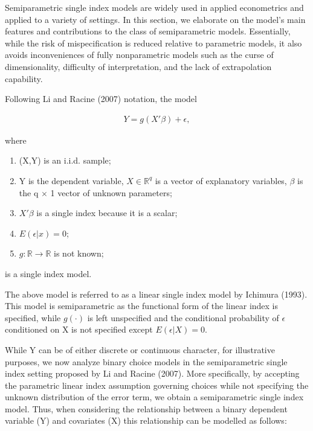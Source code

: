 \documentclass[a4paper]{article}
\begin{document}
Semiparametric single index models are widely used in applied econometrics and applied to a variety of settings.
In this section, we elaborate on the model's main features and contributions to the class of semiparametric models. Essentially, while the risk of mispecification is reduced relative to parametric models, it also avoids inconveniences of fully nonparametric models such as the curse of dimensionality, difficulty of interpretation, and the lack of extrapolation capability.
  
\vspace{5mm} 

Following Li and Racine (2007) notation, the model 

\begin{eqnarray}
Y = g(X'\beta) + \epsilon,  %
\end{eqnarray}

where

\begin{enumerate}
	\item (X,Y) is an i.i.d. sample; %
	\item Y is the dependent variable, $X\in \mathbb{R}^{q}$ is a vector of explanatory variables, $\beta$ is the q $\times$ 1 vector of unknown parameters; %
	\item $X'\beta$ is a single index because it is a scalar;
	\item $ E(\epsilon|x) = 0 $;
	\item $g: \mathbb{R} \rightarrow \mathbb{R} $ is not known; %
\end{enumerate}

is a single index model.

\vspace{5mm} 

The above model is referred to as a linear single index model by Ichimura (1993). This model is semiparametric as the functional form of the linear index is specified, while $g(\cdot)$ is left unspecified and the conditional probability of $\epsilon$ conditioned on X is not specified except $ E(\epsilon|X) = 0 $. 

While Y can be of either discrete or continuous character, for illustrative purposes, we now analyze binary choice models in the semiparametric single index setting proposed by Li and Racine (2007). More specifically, by accepting the parametric linear index assumption governing choices while not specifying the unknown distribution of the error term, we obtain a semiparametric single index model. Thus, when considering the relationship between a binary dependent variable (Y) and covariates (X) this relationship can be modelled as follows:
\end{document}
